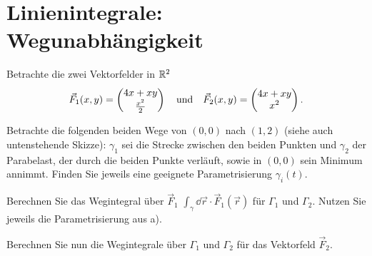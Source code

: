 \documentclass{scrartcl}
\begin{document}
\section{Linienintegrale: Wegunabhängigkeit}
\label{sec:linienintegrale_wegunabh_ngigkeit}

Betrachte die zwei Vektorfelder in $\mathbb{R}^2$
\[
  \vec F_1(x, y) = \begin{pmatrix}4x + xy \\ \frac{x^2}{2}\end{pmatrix} \quad \mbox{und} \quad \vec F_2 (x, y) = \begin{pmatrix}4x + xy \\ x^2\end{pmatrix}.
\]
\begin{subex}
  \item Betrachte die folgenden beiden Wege von $(0,0)$ nach $(1,2)$ (siehe auch untenstehende Skizze):
  $\gamma_1$ sei die Strecke zwischen den beiden Punkten und $\gamma_2$ der Parabelast, der durch die beiden Punkte verläuft, sowie in $(0,0)$ sein Minimum annimmt.
  Finden Sie jeweils eine geeignete Parametrisierung $\gamma_i(t)$.
  \item Berechnen Sie das Wegintegral über $\vec F_1$ $\int_\gamma \dd \vec r \cdot \vec F_1(\vec r)$ für $\Gamma_1$ und $\Gamma_2$.
  Nutzen Sie jeweils die Parametrisierung aus a).
  \item Berechnen Sie nun die Wegintegrale über $\Gamma_1$ und $\Gamma_2$ für das Vektorfeld $\vec F_2$.
\end{subex}

\begin{center}
\end{center}
\end{document}
